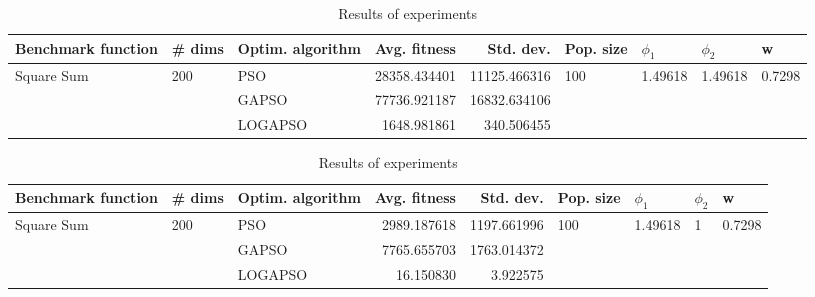 \documentclass{article}
\begin{document}
\begin{table}
\centering
\caption{Results of experiments}
\begin{tabular}{lllrrllll}
\toprule
         Benchmark function &              \# dims & Optim. algorithm &  Avg. fitness &    Std. dev. &            Pop. size &               $\phi_{1}$ &               $\phi_{2}$ &                       w \\
\midrule
\multirow{3}{*}{Square Sum} & \multirow{3}{*}{200} &              PSO &  28358.434401 & 11125.466316 & \multirow{3}{*}{100} & \multirow{3}{*}{1.49618} & \multirow{3}{*}{1.49618} & \multirow{3}{*}{0.7298} \\
                            &                      &            GAPSO &  77736.921187 & 16832.634106 &                      &                          &                          &                         \\
                            &                      &          LOGAPSO &   1648.981861 &   340.506455 &                      &                          &                          &                         \\
\bottomrule
\end{tabular}
\end{table}
\begin{table}
\centering
\caption{Results of experiments}
\begin{tabular}{lllrrllll}
\toprule
         Benchmark function &              \# dims & Optim. algorithm &  Avg. fitness &   Std. dev. &            Pop. size &               $\phi_{1}$ &         $\phi_{2}$ &                       w \\
\midrule
\multirow{3}{*}{Square Sum} & \multirow{3}{*}{200} &              PSO &   2989.187618 & 1197.661996 & \multirow{3}{*}{100} & \multirow{3}{*}{1.49618} & \multirow{3}{*}{1} & \multirow{3}{*}{0.7298} \\
                            &                      &            GAPSO &   7765.655703 & 1763.014372 &                      &                          &                    &                         \\
                            &                      &          LOGAPSO &     16.150830 &    3.922575 &                      &                          &                    &                         \\
\bottomrule
\end{tabular}
\end{table}
\end{document}
